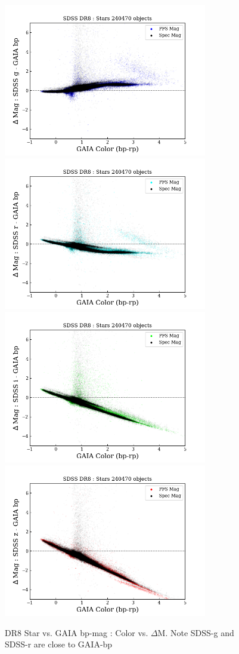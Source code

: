 \documentclass[apj,twocolumn]{aastex631}
\begin{document}
\begin{figure}%
\begin{center}
\includegraphics[angle=0,width=8.9cm]{figures/20220812_color_dmag_g_bp_dr8star.png}
\includegraphics[angle=0,width=8.9cm]{figures/20220812_color_dmag_r_bp_dr8star.png}
\includegraphics[angle=0,width=8.9cm]{figures/20220812_color_dmag_i_bp_dr8star.png}
\includegraphics[angle=0,width=8.9cm]{figures/20220812_color_dmag_z_bp_dr8star.png}
\caption{DR8 Star vs. GAIA bp-mag : Color vs. $\Delta$M.  Note SDSS-g and SDSS-r are close to GAIA-bp}
\end{center}
\end{figure}
\end{document}

